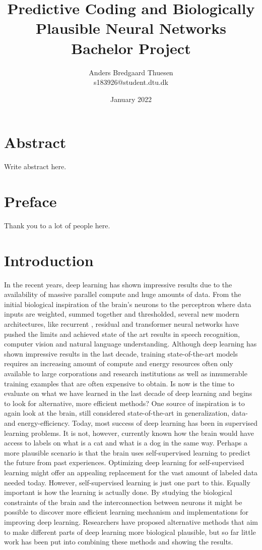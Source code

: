 \documentclass[a4paper,11pt]{article} %
\title{
  Predictive Coding and Biologically Plausible Neural Networks \\
  \large{Bachelor Project}
}
\author{Anders Bredgaard Thuesen \\ s183926@student.dtu.dk}
\date{January 2022}
\begin{document}
\maketitle
\thispagestyle{empty}
\section*{Abstract}
Write abstract here.

\newpage 
\thispagestyle{empty}
\section*{Preface}
Thank you to a lot of people here.

\newpage
\tableofcontents
\thispagestyle{empty}

\newpage

\setcounter{page}{1}

\section{Introduction}
In the recent years, deep learning has shown impressive results due to the availability of massive parallel compute and huge amounts of data. From the initial biological inspiration of the brain’s neurons to the perceptron where data inputs are weighted, summed together and thresholded, several new modern architectures, like recurrent \cite{lstm}, residual \cite{resnet} and transformer neural networks \cite{transformers} have pushed the limits and achieved state of the art results in speech recognition, computer vision and natural language understanding. Although deep learning has shown impressive results in the last decade, training state-of-the-art models requires an increasing amount of compute and energy resources often only available to large corporations and research institutions as well as innumerable training examples that are often expensive to obtain. Is now is the time to evaluate on what we have learned in the last decade of deep learning and begins to look for alternative, more efficient methods? One source of inspiration is to again look at the brain, still considered state-of-the-art in generalization, data- and energy-efficiency. Today, most success of deep learning has been in supervised learning problems. It is not, however, currently known how the brain would have access to labels on what is a cat and what is a dog in the same way. Perhaps a more plausible scenario is that the brain uses self-supervised learning to predict the future from past experiences. Optimizing deep learning for self-supervised learning might offer an appealing replacement for the vast amount of labeled data needed today. However, self-supervised learning is just one part to this. Equally important is how the learning is actually done. By studying the biological constraints of the brain and the interconnection between neurons it might be possible to discover more efficient learning mechanism and implementations for improving deep learning. Researchers have proposed alternative methods that aim to make different parts of deep learning more biological plausible, but so far little work has been put into combining these methods and showing the results. 
\end{document}
